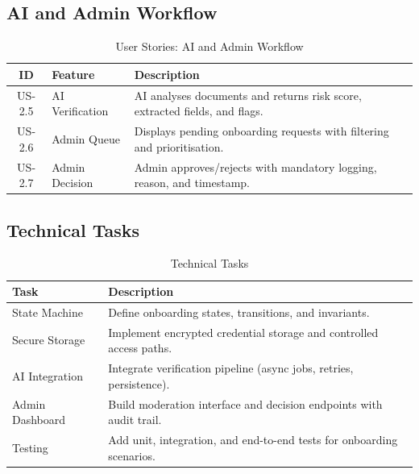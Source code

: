 \documentclass[a4paper,12pt]{report}
\begin{document}
\subsection{AI and Admin Workflow}
\begin{table}[H]
\centering
\begin{tabularx}{\textwidth}{|c|X|X|}
\hline
\rowcolor{medgray}
\textbf{ID} & \textbf{Feature} & \textbf{Description} \\
\midrule
\hline

US-2.5 & AI Verification & AI analyses documents and returns risk score, extracted fields, and flags. \\ \hline
US-2.6 & Admin Queue & Displays pending onboarding requests with filtering and prioritisation. \\ \hline
US-2.7 & Admin Decision & Admin approves/rejects with mandatory logging, reason, and timestamp. \\ \hline

\end{tabularx}
\caption{User Stories: AI and Admin Workflow}
\end{table}

\subsection{Technical Tasks}
\begin{table}[H]
\centering
\begin{tabularx}{\textwidth}{|X|X|}
\hline
\rowcolor{medgray}
\textbf{Task} & \textbf{Description} \\
\midrule
\hline

State Machine & Define onboarding states, transitions, and invariants. \\ \hline
Secure Storage & Implement encrypted credential storage and controlled access paths. \\ \hline
AI Integration & Integrate verification pipeline (async jobs, retries, persistence). \\ \hline
Admin Dashboard & Build moderation interface and decision endpoints with audit trail. \\ \hline
Testing & Add unit, integration, and end-to-end tests for onboarding scenarios. \\ \hline

\end{tabularx}
\caption{Technical Tasks}
\end{table}

\end{document}
